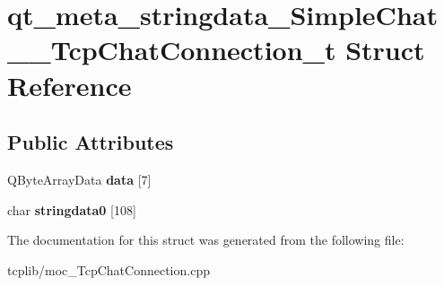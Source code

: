 \hypertarget{structqt__meta__stringdata__SimpleChat____TcpChatConnection__t}{\section{qt\-\_\-meta\-\_\-stringdata\-\_\-\-Simple\-Chat\-\_\-\-\_\-\-Tcp\-Chat\-Connection\-\_\-t Struct Reference}
\label{structqt__meta__stringdata__SimpleChat____TcpChatConnection__t}
}
\subsection*{Public Attributes}
\begin{DoxyCompactItemize}
\item 
\hypertarget{structqt__meta__stringdata__SimpleChat____TcpChatConnection__t_aaabc4e1b64867976050ccbbb62ef49c9}{Q\-Byte\-Array\-Data {\bfseries data} \mbox{[}7\mbox{]}}\label{structqt__meta__stringdata__SimpleChat____TcpChatConnection__t_aaabc4e1b64867976050ccbbb62ef49c9}

\item 
\hypertarget{structqt__meta__stringdata__SimpleChat____TcpChatConnection__t_a93cd422253f05a845bb7a5db436856fc}{char {\bfseries stringdata0} \mbox{[}108\mbox{]}}\label{structqt__meta__stringdata__SimpleChat____TcpChatConnection__t_a93cd422253f05a845bb7a5db436856fc}

\end{DoxyCompactItemize}


The documentation for this struct was generated from the following file\-:\begin{DoxyCompactItemize}
\item 
tcplib/moc\-\_\-\-Tcp\-Chat\-Connection.\-cpp\end{DoxyCompactItemize}
